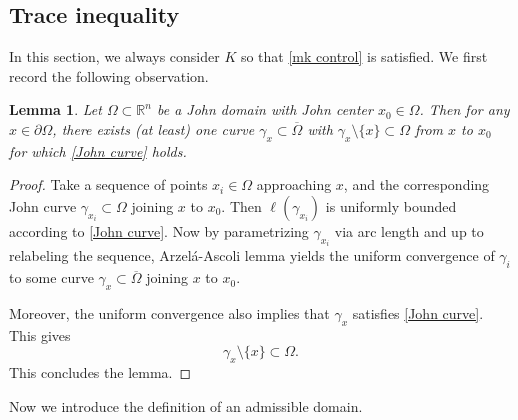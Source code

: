 \documentclass[reqno,11pt]{amsart}
\makeatletter
\def\dist{{\mathop\mathrm{\,dist\,}}}
\def\gz{{\gamma}}
\newtheorem{lem}[thm]{Lemma}%
\numberwithin{equation}{section}
\theoremstyle{remark}
\makeatother
\begin{document}



\subsection{Trace inequality}


In this section, we always consider $K$ so that \eqref{mk control} is satisfied. 
We first record the following observation. 

\begin{lem}\label{lem:boundary curve}
    Let $\Omega\subset\mathbb R^n$ be a John domain with John center $x_0\in \Omega$. Then for any $x\in \partial \Omega$, there exists (at least) one  curve $\gamma_x\subset \overline{\Omega}$ with $\gz_x\setminus\{x\}\subset \Omega$ from $x$ to $x_0$ for which \eqref{John curve} holds. 
\end{lem}
\begin{proof}
     Take a sequence of points $x_i\in \Omega$ approaching $x$,  and the corresponding John curve $\gz_{x_i}\subset \Omega$ joining $x$ to $x_0$. Then $\ell(\gz_{x_i})$ is uniformly bounded according to \eqref{John curve}. Now by parametrizing $\gamma_{x_i}$ via arc length and up to relabeling the sequence, Arzel\'a-Ascoli lemma yields the uniform convergence of  $\gz_i$ to some curve $\gz_x\subset \overline{\Omega}$ joining $x$ to $x_0$. 
     
Moreover, the uniform convergence also implies that $\gz_x$  satisfies \eqref{John curve}. This gives 
$$\gz_x\setminus\{x\}\subset \Omega.$$ 
This concludes the lemma.  
\end{proof}

 
 Now we introduce the definition of an admissible domain. 
\end{document}
